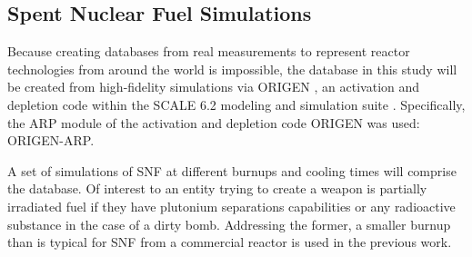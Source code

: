 \subsection{Spent Nuclear Fuel Simulations}
\label{sec:snfsim}

Because creating databases from real measurements to represent reactor
technologies from around the world is impossible, the database in this study
will be created from high-fidelity simulations via \gls{ORIGEN} \cite{origen},
an activation and depletion code within the SCALE 6.2 modeling and simulation
suite \cite{scale}. Specifically, the ARP module of the activation and
depletion code ORIGEN was used: \gls{ORIGEN-ARP}.

A set of simulations of \gls{SNF} at different burnups and cooling times will
comprise the database.  Of interest to an entity trying to create a weapon is
partially irradiated fuel if they have plutonium separations capabilities or
any radioactive substance in the case of a dirty bomb.  Addressing the former,
a smaller burnup than is typical for \gls{SNF} from a commercial reactor is
used in the previous work.  

